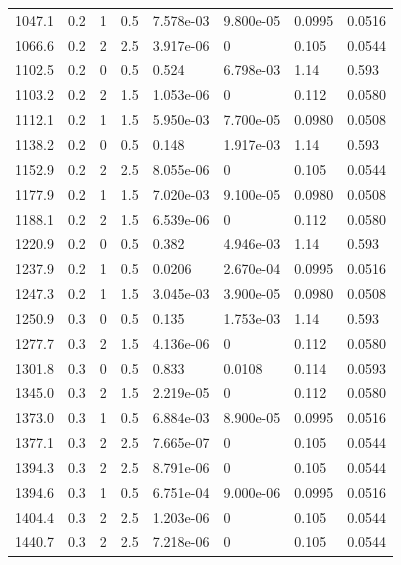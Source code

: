 \documentclass[preview]{standalone}
\begin{document}
{{{\begin{tabular}{L{1.2cm}C{1.2cm} C{0.3cm}C{0.5cm} C{1.4cm}C{1.4cm} C{1.4cm}C{1.4cm}}
  1047.1  &   0.2  & 1     & 0.5 &  7.578e-03  & 9.800e-05  & 0.0995 &  0.0516   \\ 
  1066.6  &   0.2  & 2     & 2.5 &  3.917e-06  & 0  & 0.105 &  0.0544   \\ 
  1102.5  &   0.2  & 0     & 0.5 &  0.524  & 6.798e-03  & 1.14 &  0.593   \\ 
  1103.2  &   0.2  & 2     & 1.5 &  1.053e-06  & 0  & 0.112 &  0.0580   \\ 
  1112.1  &   0.2  & 1     & 1.5 &  5.950e-03  & 7.700e-05  & 0.0980 &  0.0508   \\ 
  1138.2  &   0.2  & 0     & 0.5 &  0.148  & 1.917e-03  & 1.14 &  0.593   \\ 
  1152.9  &   0.2  & 2     & 2.5 &  8.055e-06  & 0  & 0.105 &  0.0544   \\ 
  1177.9  &   0.2  & 1     & 1.5 &  7.020e-03  & 9.100e-05  & 0.0980 &  0.0508   \\ 
  1188.1  &   0.2  & 2     & 1.5 &  6.539e-06  & 0  & 0.112 &  0.0580   \\ 
  1220.9  &   0.2  & 0     & 0.5 &  0.382  & 4.946e-03  & 1.14 &  0.593   \\ 
  1237.9  &   0.2  & 1     & 0.5 &  0.0206  & 2.670e-04  & 0.0995 &  0.0516   \\ 
  1247.3  &   0.2  & 1     & 1.5 &  3.045e-03  & 3.900e-05  & 0.0980 &  0.0508   \\ 
  1250.9  &   0.3  & 0     & 0.5 &  0.135  & 1.753e-03  & 1.14 &  0.593   \\ 
  1277.7  &   0.3  & 2     & 1.5 &  4.136e-06  & 0  & 0.112 &  0.0580   \\ 
  1301.8  &   0.3  & 0     & 0.5 &  0.833  & 0.0108  & 0.114 &  0.0593   \\ 
  1345.0  &   0.3  & 2     & 1.5 &  2.219e-05  & 0  & 0.112 &  0.0580   \\ 
  1373.0  &   0.3  & 1     & 0.5 &  6.884e-03  & 8.900e-05  & 0.0995 &  0.0516   \\ 
  1377.1  &   0.3  & 2     & 2.5 &  7.665e-07  & 0  & 0.105 &  0.0544   \\ 
  1394.3  &   0.3  & 2     & 2.5 &  8.791e-06  & 0  & 0.105 &  0.0544   \\ 
  1394.6  &   0.3  & 1     & 0.5 &  6.751e-04  & 9.000e-06  & 0.0995 &  0.0516   \\ 
  1404.4  &   0.3  & 2     & 2.5 &  1.203e-06  & 0  & 0.105 &  0.0544   \\ 
  1440.7  &   0.3  & 2     & 2.5 &  7.218e-06  & 0  & 0.105 &  0.0544   \\ 

\end{tabular}}}}
\end{document}
